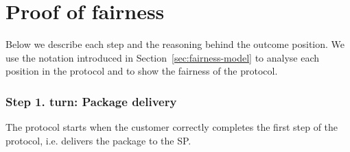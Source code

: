 \documentclass[pdftex,twocolumn,epjc3]{svjour3}
\renewcommand{\sp}{SP}
\begin{document}
\appendix

\begin{sloppypar}
\section{Proof of fairness}\label{app:proof-of-fairness}
Below we describe each step and the reasoning behind the outcome position.
We use the notation introduced in Section~\ref{sec:fairness-model} to analyse each position in the protocol and to show the fairness of the protocol.

\newcommand{\AgreeablePath}{Agreeable path:}
\newcommand{\DisputePath}{The customer starts a dispute:}
\newcommand{\Fairness}{Fairness:}
\newcommand{\CustomerTurn}[0]{\expandafter\MakeUppercase customer turn:}
\newcommand{\SPTurn}[0]{\sp{} turn:}

\newcommand{\CanFollowToOne}[2]{The #1 can follow the protocol to the non-disadvantaged position #2}
\newcommand{\CanDoNothing}[1]{The #1 can do nothing and always ends up in the non-disadvantaged position}
\newcommand{\CanDoAnything}[1]{The #1 can do anything and always ends up in the non-disadvantaged position}
\newcommand{\Pos}[4]{$\operatorname{\sigma_{#1, #2, #3} = #4}$}
\newcommand{\WinForTheSameReason}[1]{The #1 wins the dispute for the same reason}
\newcommand{\LoseForTheSameReason}[1]{The #1 loses the dispute for the same reason}
\newcommand{\ActedAbnormallyThen}[1]{The #1 acted abnormally, then:}
\newcommand{\CustomerPaidButDidntGetResult}{The customer ends up in a disadvantageous position, because he has paid in advance, but hasn't received the result}
\newcommand{\SpReceivedThePayment}{The SP ends up in the advantageous position, having received the payment}

\newcommand{\CustomerLosesBeforePayment}{The customer loses the dispute because the SP is not obliged to do anything until the transaction is paid}
\newcommand{\CustomerLosesBeforePoP}{The customer loses the dispute because the SP is still able to publish the PoP within the agreed timeframe}

\newcommand{\RemainsIn}[2]{The #1 remains in the #2 position}

\subsubsection*{Step 1. \CustomerTurn{} Package delivery}\label{step-1-deliver-package}

The protocol starts when the customer correctly completes the first step of the protocol, i.e. delivers the package to the SP. 


\end{sloppypar}
\end{document}
